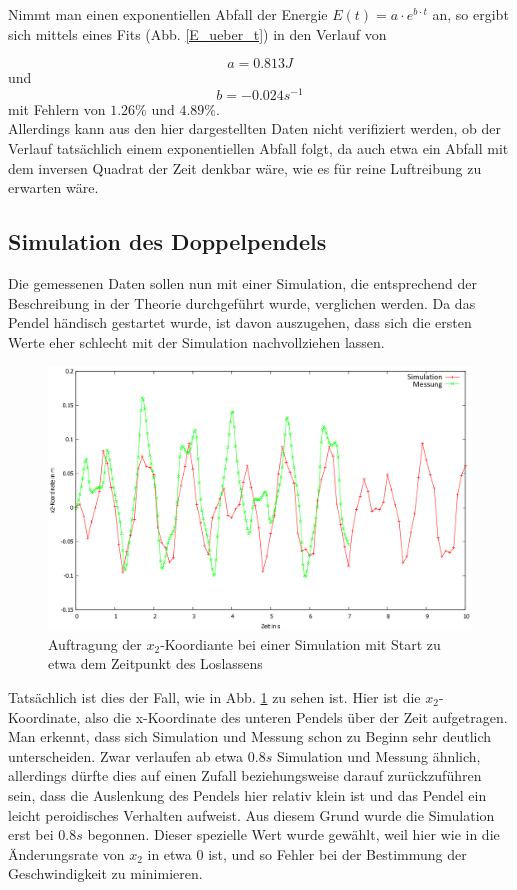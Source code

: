 Nimmt man einen exponentiellen Abfall der Energie $ E(t) = a \cdot e^{b \cdot t} $ an, so ergibt sich mittels eines Fits (Abb. \ref{E_ueber_t}) in den Verlauf von 

\begin{equation}
 a = 0.813   J
\nonumber
\end{equation}  und  
\begin{equation}
b = -0.024  s^{-1}
\nonumber
\end{equation} 
mit Fehlern von $1.26 \% $ und $ 4.89 \% $. \\
Allerdings kann aus den hier dargestellten Daten nicht verifiziert werden, ob der Verlauf tatsächlich einem exponentiellen Abfall folgt, da auch etwa ein Abfall mit dem inversen Quadrat der Zeit denkbar wäre, wie es für reine Luftreibung zu erwarten wäre. 

\subsection{Simulation des Doppelpendels}
Die gemessenen Daten sollen nun mit einer Simulation, die entsprechend der Beschreibung in der Theorie durchgeführt wurde, verglichen werden. Da das Pendel händisch gestartet wurde, ist davon auszugehen, dass sich die ersten Werte eher schlecht mit der Simulation nachvollziehen lassen. 


\begin{figure}
        \includegraphics[width=.9\textwidth]{images/x2_ueber_t_beginn_neu.png}
\caption{Auftragung der $x_2$-Koordiante bei einer Simulation mit Start zu etwa dem Zeitpunkt des Loslassens}
\label{x2_ueber_t_alt}
\end{figure}


Tatsächlich ist dies der Fall, wie in Abb. \ref{x2_ueber_t_alt} zu sehen ist. Hier ist die $x_2$-Koordinate, also die x-Koordinate des unteren Pendels über der Zeit aufgetragen. Man erkennt, dass sich Simulation und Messung schon zu Beginn sehr deutlich unterscheiden. Zwar verlaufen ab etwa $ 0.8 s $ Simulation und Messung ähnlich, allerdings dürfte dies auf einen Zufall beziehungsweise darauf zurückzuführen sein, dass die Auslenkung des Pendels hier relativ klein ist und das Pendel ein leicht peroidisches Verhalten aufweist. 
Aus diesem Grund wurde die Simulation erst bei $ 0.8 s $ begonnen. Dieser spezielle Wert wurde gewählt, weil hier wie in  die Änderungsrate von $x_2$ in etwa 0 ist, und so Fehler bei der Bestimmung der Geschwindigkeit zu minimieren. 

